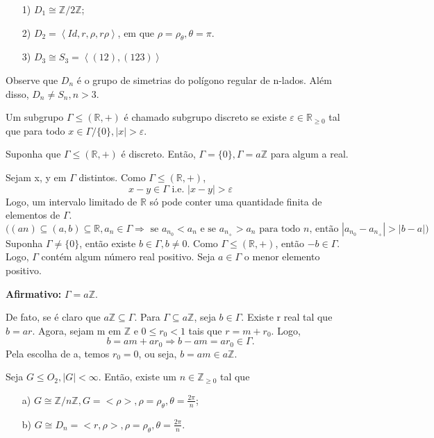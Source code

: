 \documentclass[algebra_notes.tex]{subfiles}
\begin{document}
\begin{example*}
	\begin{itemize}
		\item[1)] \(D_{1}\cong{\mathbb{Z}/2 \mathbb{Z}}\);
		\item[2)] \(D_{2} = \left< Id, r, \rho , r\rho  \right>\), em que \(\rho = \rho _{\theta }, \theta =\pi \).
		\item[3)] \(D_{3}\cong{S_{3}} = \left< (12), (123) \right>\)
	\end{itemize}
\end{example*}
Observe que \(D_{n}\) é o grupo de simetrias do polígono regular de n-lados.
Além disso, \(D_{n}\neq S_{n}, n >3\).
\begin{def*}
	Um subgrupo \(\Gamma\leq (\mathbb{R}, +)\) é chamado subgrupo discreto se existe
	\(\varepsilon  \in \mathbb{R}_{\geq 0}\) tal que para todo \(x\in\Gamma/\{0\}, |x| > \varepsilon .\)
\end{def*}
\begin{lemma*}
	Suponha que \(\Gamma\leq (\mathbb{R}, +)\) é discreto. Então, \(\Gamma =\{0\}, \Gamma =a \mathbb{Z}\)
	para algum a real.
\end{lemma*}
\begin{proof*}
	Sejam x, y em \(\Gamma \) distintos. Como \(\Gamma\leq (\mathbb{R}, +)\),
	\[
		x - y\in \Gamma  \text{ i.e. }  |x-y| > \varepsilon
	\]
	Logo, um intervalo limitado de \(\mathbb{R}\) só pode conter uma quantidade finita
	de elementos de \(\Gamma \).
	\[
		\biggl((an)\subseteq{(a,b)\subseteq{\mathbb{R}}}, a_{n}\in \Gamma \Rightarrow \text{ se } a_{n_{0}} < a_{n}\text{ e se } a_{n_{+}} > a_{n}\text{ para todo } n \text{, então } |a_{n_{0}}-a_{n_{+}}| > |b-a| \biggr)
	\]
	Suponha \(\Gamma \neq\{0\}\), então existe \(b\in \Gamma , b\neq0\). Como
	\(\Gamma\leq (\mathbb{R}, +)\), então \(-b\in \Gamma \). Logo, \(\Gamma \) contém
	algum número real positivo. Seja \(a\in\Gamma \) o menor elemento positivo.

	\textbf{Afirmativo: } \(\Gamma =a \mathbb{Z}\).

	De fato, se é claro que \(a \mathbb{Z} \subseteq{\Gamma }\). Para \(\Gamma \subseteq{a \mathbb{Z}}\),
	seja \(b\in \Gamma.\) Existe r real tal que \(b=ar\). Agora, sejam m em \(\mathbb{Z}\)
	e \(0\leq r_{0} < 1\) tais que \(r = m + r_{0}\). Logo,
	\[
		b = am + ar_{0} \Rightarrow b-am = ar_{0}\in\Gamma.
	\]
	Pela escolha de a, temos \(r_{0} = 0\), ou seja, \(b=am\in a \mathbb{Z}\). \qedsymbol
\end{proof*}
\begin{theorem*}
	Seja \(G\leq O_{2}, |G| < \infty\). Então, existe um \(n\in \mathbb{Z}_{\geq 0}\) tal que
	\begin{itemize}
		\item[a)] \(G\cong{\mathbb{Z}/n \mathbb{Z}}, G = <\rho >, \rho = \rho _{\theta }, \theta =\frac{2\pi }{n}\);
		\item[b)] \(G\cong{D_{n} = <r, \rho >}, \rho  = \rho _{\theta }, \theta =\frac{2\pi }{n}\).
	\end{itemize}
\end{theorem*}
\end{document}

